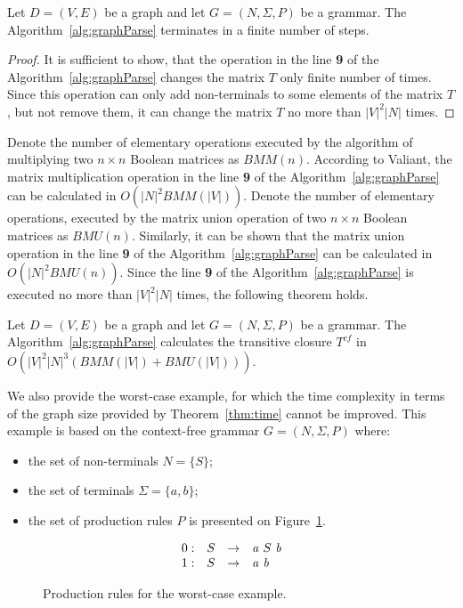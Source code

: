 \begin{mytheorem}\label{thm:finite}
 Let $D = (V,E)$ be a graph and let $G =(N,\Sigma,P)$ be a grammar. The Algorithm~\ref{alg:graphParse} terminates in a finite number of steps. 
\end{mytheorem}
\begin{proof}
It is sufficient to show, that the operation in the line \textbf{9} of the Algorithm~\ref{alg:graphParse} changes the matrix $T$ only finite number of times. Since this operation can only add non-terminals to some elements of the matrix $T$, but not remove them, it can change the matrix $T$ no more than $|V|^2|N|$ times.
\end{proof}

Denote the number of elementary operations executed by the algorithm of multiplying two $n \times n$ Boolean matrices as $BMM(n)$. According to Valiant, the matrix multiplication operation in the line \textbf{9} of the Algorithm~\ref{alg:graphParse} can be calculated in $O(|N|^2 BMM(|V|))$. Denote the number of elementary operations, executed by the matrix union operation of two $n \times n$ Boolean matrices as $BMU(n)$. Similarly, it can be shown that the matrix union operation in the line \textbf{9} of the Algorithm~\ref{alg:graphParse} can be calculated in $O(|N|^2 BMU(n))$. Since the line \textbf{9} of the Algorithm~\ref{alg:graphParse} is executed no more than $|V|^2|N|$ times, the following theorem holds.

\begin{mytheorem}\label{thm:time}
 Let $D = (V,E)$ be a graph and let $G =(N,\Sigma,P)$ be a grammar. The Algorithm~\ref{alg:graphParse} calculates the transitive closure $T^{cf}$ in $O(|V|^2|N|^3(BMM(|V|) + BMU(|V|)))$.
\end{mytheorem}

We also provide the worst-case example, for which the time complexity in terms of the graph size provided by Theorem~\ref{thm:time} cannot be improved. This example is based on the context-free grammar $G = (N, \Sigma, P)$ where:
\begin{itemize}
	\item the set of non-terminals $N = \{S\}$;
	\item the set of terminals $\Sigma = \{a, b\}$;
	\item the set of production rules $P$ is presented on Figure~\ref{ProductionRulesWorsCaseExample}.
\end{itemize}

\begin{figure}[h]
	\[
	\begin{array}{rccl}
	0: & S & \rightarrow & \text{\emph{a}} \ S \ \text{\emph{b}} \\
	1: & S & \rightarrow & \text{\emph{a}} \ \text{\emph{b}} \\ 
	\end{array}
	\]
	\caption{Production rules for the worst-case example.}
	\label{ProductionRulesWorsCaseExample}
\end{figure}

